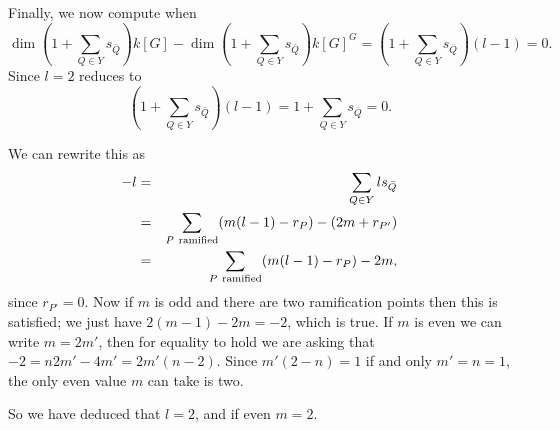 \documentclass[11pt]{article} %
\theoremstyle{remark}\newtheorem*{rem}{Remark}
\begin{document}
Finally, we now compute when 
\[
 \dim \left( 1 + \sum_{Q\in Y} s_{\bar Q} \right) k[G] - \dim \left( 1 + \sum_{Q\in Y} s_{\bar Q} \right) k[G]^G = \left( 1 + \sum_{Q\in Y} s_{\bar Q} \right)(l-1) = 0.
\]
Since $l=2$ reduces to
\[
 \left( 1 + \sum_{Q\in Y} s_{\bar Q} \right)(l-1) = 1 + \sum_{Q\in Y} s_{\bar Q} = 0.
\]

We can rewrite this as
\begin{eqnarray*}
 -l &=& \sum_{Q\in Y} ls_{\bar Q}\\
 &= &\sum_{P\ \rm{ramified}}( m(l-1) -r_P )- (2m + r_{P'})\\
& =& \sum_{P\ \rm{ramified}}( m(l-1) -r_P )- 2m,
\end{eqnarray*}
since $r_{P'}=0$.
Now if $m$ is odd and there are two ramification points then this is satisfied; we just have $2(m-1) -2m = -2$, which is true.
If $m$ is even we can write $m = 2m'$, then for equality to hold we are asking that $-2=n2m'-4m'= 2m'(n-2)$. 
Since $m'(2-n) = 1$ if and only $m' = n = 1$, the only even value $m$ can take is two.

So we have deduced that $l=2$, and if even $m=2$.



\end{document}
